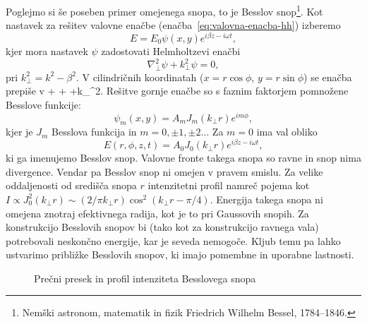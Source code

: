 Poglejmo si še poseben primer omejenega snopa, to je Besslov
snop\footnote{Nemški astronom, matematik in fizik Friedrich Wilhelm Bessel, 1784--1846.}. 
Kot nastavek za rešitev valovne enačbe (enačba~\ref{eq:valovna-enacba-hh})
izberemo
\begin{equation}
E=E_{0}\psi(x,y)e^{i\beta z-i\omega t},
\end{equation}
kjer mora nastavek $\psi$ zadostovati Helmholtzevi enačbi
\begin{equation}
\nabla_{\perp}^{2}\psi+k_{\perp}^{2}\psi=0,
\end{equation}
pri $k_{\perp}^{2}=k^{2}-\beta^{2}$. V cilindričnih
koordinatah ($x=r\cos\phi$, $y=r\sin\phi$) se enačba prepiše v 
\beq
{}+ 
+ +k_{\perp}^{2}.
\eeq
Rešitve gornje enačbe so s faznim faktorjem pomnožene Besslove funkcije:
\begin{equation}
\psi_m(x,y)=A_{m}J_{m}(k_{\perp}r)e^{im\phi},
\end{equation}
kjer je $J_{m}$ Besslova funkcija in $m=0,\pm1,\pm2 \ldots$ Za
$m=0$ ima val obliko
\begin{equation}
E(r,\phi,z,t)=A_{0}J_{0}(k_{\perp}r)e^{i\beta z-i \omega t},
\label{eq:Besslov-snop}
\end{equation}
ki ga imenujemo Besslov snop. Valovne fronte takega snopa so ravne 
in snop nima divergence. Vendar pa Besslov snop ni omejen v pravem smislu. Za 
velike oddaljenosti od središča snopa $r$ intenzitetni profil namreč pojema kot 
$I \propto J_{0}^{2}(k_{\perp}r)\sim (2/\pi k_{\perp}r)\cos^{2}(k_{\perp}r-\pi/4)$.
Energija takega snopa ni omejena znotraj efektivnega radija,
kot je to pri Gaussovih snopih. Za konstrukcijo Besslovih snopov
bi (tako kot za konstrukcijo ravnega vala) potrebovali neskončno energije,
kar je seveda nemogoče. Kljub temu pa lahko ustvarimo približke Besslovih 
snopov, ki imajo pomembne in uporabne lastnosti. 

\begin{figure}[h]
\centering
\def\svgwidth{80truemm} 

\caption{Prečni presek in profil intenziteta Besslovega snopa}
\label{fig:Besslov_presek}
\end{figure}

